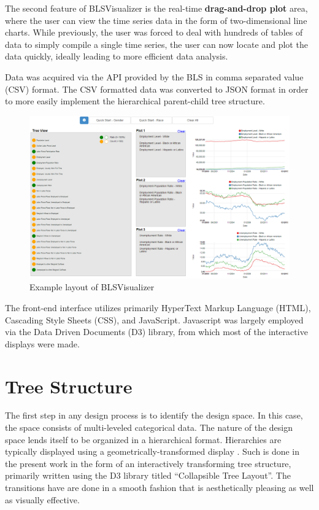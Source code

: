 \documentclass[journal]{IEEEtran}
\begin{document}
{The second feature of BLSVisualizer is the real-time \textbf{drag-and-drop plot} area, where the user can view the time series data in the form of two-dimensional line charts. While previously, the user was forced to deal with hundreds of tables of data to simply compile a single time series, the user can now locate and plot the data quickly, ideally leading to more efficient data analysis. 

Data was acquired via the API provided by the BLS in comma separated value (CSV) format. The CSV formatted data was converted to JSON format in order to more easily implement the hierarchical parent-child tree structure. 

\begin{figure}[t]
\centering
    \includegraphics[width = 6.2in]{BLSVisualizer.png}
    \caption{Example layout of BLSVisualizer }
    \label{BLSVLayout}
\end{figure}   

The front-end interface utilizes primarily HyperText Markup Language (HTML), Cascading Style Sheets (CSS), and JavaScript. Javascript was largely employed via the Data Driven Documents (D3) library, from which most of the interactive displays were made. 

\section{Tree Structure}

The first step in any design process is to identify the design space. In this case, the space consists of multi-leveled categorical data. The nature of the design space lends itself to be organized in a hierarchical format. Hierarchies are typically displayed using a geometrically-transformed display \cite{Keim2002}. Such is done in the present work in the form of an interactively transforming tree structure, primarily written using the D3 library titled ``Collapsible Tree Layout''. The transitions have are done in a smooth fashion that is aesthetically pleasing as well as visually effective. 

}
\end{document}
